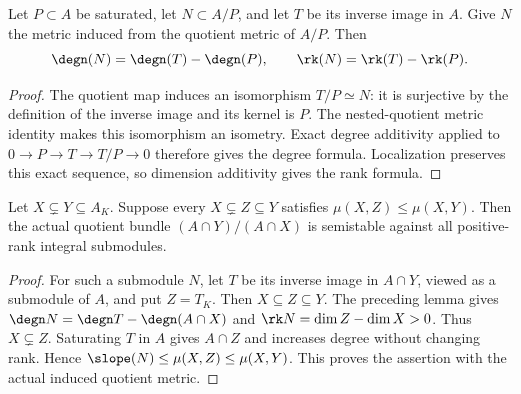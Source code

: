 \begin{lemma}
\label{lem:quotient-submodule-degree}
\leanok
Let $P\subset A$ be saturated, let $N\subset A/P$, and let
$T$ be its inverse image in $A$. Give $N$ the metric induced from the
quotient metric of $A/P$. Then
\[
 \degn(N)=\degn(T)-\degn(P),\qquad
 \rk(N)=\rk(T)-\rk(P).
\]
\end{lemma}
\begin{proof}
The quotient map induces an isomorphism $T/P\simeq N$: it is
surjective by the definition of the inverse image and its kernel is $P$.
The nested-quotient metric identity makes this isomorphism an isometry.
Exact degree additivity applied to $0\to P\to T\to T/P\to0$
therefore gives the degree formula. Localization preserves this exact
sequence, so dimension additivity gives the rank formula.
\end{proof}

\begin{lemma}
\label{lem:quotient-interval-semistable}
\leanok
Let $X\subsetneq Y\subseteq A_K$. Suppose every $X\subsetneq Z\subseteq Y$
satisfies $\mu(X,Z)\leq\mu(X,Y)$. Then the actual quotient bundle
$(A\cap Y)/(A\cap X)$ is semistable against all positive-rank integral
submodules.
\end{lemma}
\begin{proof}
For such a submodule $N$, let $T$ be its inverse image in $A\cap Y$,
viewed as a submodule of $A$, and put $Z=T_K$. Then $X\subseteq Z\subseteq Y$.
The preceding lemma gives
$\degn N=\degn T-\degn(A\cap X)$ and
$\rk N=\dim Z-\dim X>0$. Thus $X\subsetneq Z$.
Saturating $T$ in $A$ gives $A\cap Z$ and increases degree without
changing rank. Hence $\slope(N)\leq\mu(X,Z)\leq\mu(X,Y)$.
This proves the assertion with the actual induced quotient metric.
\end{proof}

